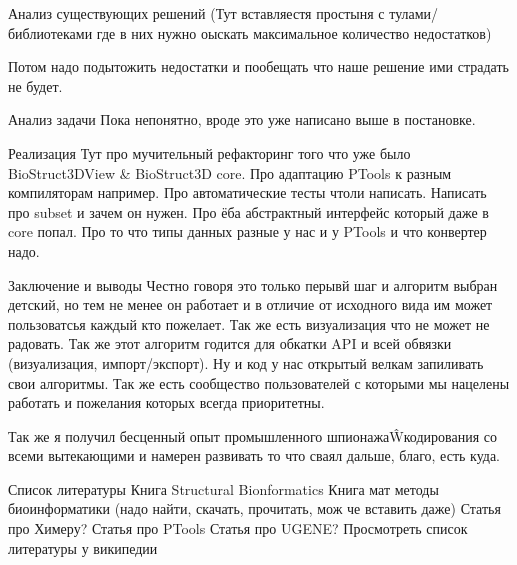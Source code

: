 \documentclass[utf8]{article}
\begin{document}
Анализ существующих решений
(Тут вставляестя простыня с тулами/библиотеками где в них нужно оыскать максимальное количество недостатков)

Потом надо подытожить недостатки и пообещать что наше решение ими страдать не будет.

Анализ задачи
Пока непонятно, вроде это уже написано выше в постановке.

Реализация
Тут про мучительный рефакторинг того что уже было BioStruct3DView \& BioStruct3D core.
Про адаптацию PTools к разным компиляторам например.
Про автоматические тесты чтоли написать.
Написать про subset и зачем он нужен. 
Про ёба абстрактный интерфейс который даже в core попал.
Про то что типы данных разные у нас и у PTools и что конвертер надо.

Заключение и выводы
Честно говоря это только перывй шаг и алгоритм выбран детский, но тем не менее он работает и в отличие от исходного вида им может пользоватсья каждый кто пожелает. Так же есть визуализация что не может не радовать. Так же этот алгоритм годится для обкатки API и всей обвязки (визуализация, импорт/экспорт). Ну и код у нас открытый велкам запиливать свои алгоритмы. Так же есть сообщество пользователей с которыми мы нацелены работать и пожелания которых всегда приоритетны. 

Так же я получил бесценный опыт промышленного шпионажа\^Wкодирования со всеми вытекающими и намерен развивать то что сваял дальше, благо, есть куда.

Список литературы
Книга Structural Bionformatics
Книга мат методы биоинформатики (надо найти, скачать, прочитать, мож че вставить даже)
Статья про Химеру?
Статья про PTools
Статья про UGENE?
Просмотреть список литературы у википедии
\end{document}
